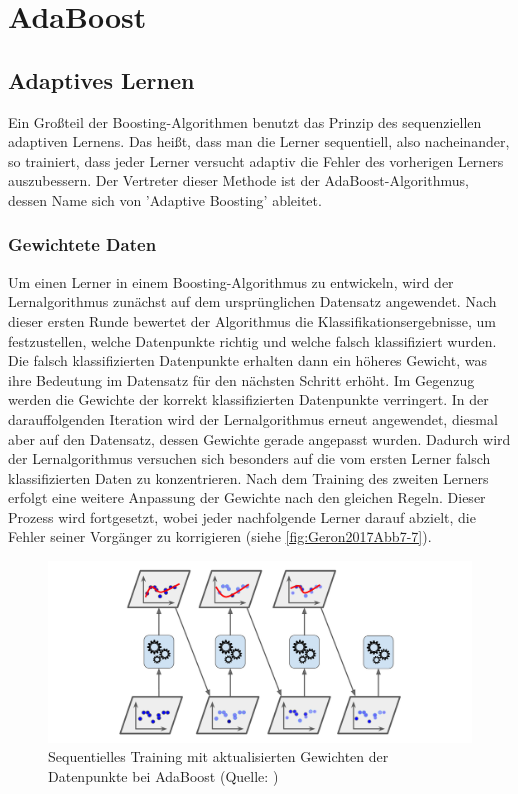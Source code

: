 \section{AdaBoost}
\subsection{Adaptives Lernen}
\label{sec:adaptive_learning}
Ein Großteil der Boosting-Algorithmen benutzt das Prinzip des sequenziellen adaptiven Lernens. Das heißt, dass man die Lerner sequentiell, also nacheinander, so trainiert, dass jeder Lerner versucht adaptiv die Fehler des vorherigen Lerners auszubessern.
\newline
Der Vertreter dieser Methode ist der AdaBoost-Algorithmus, dessen Name sich von 'Adaptive Boosting' ableitet.
\subsubsection{Gewichtete Daten}
Um einen Lerner in einem Boosting-Algorithmus zu entwickeln, wird der Lernalgorithmus zunächst auf dem ursprünglichen Datensatz angewendet. Nach dieser ersten Runde bewertet der Algorithmus die Klassifikationsergebnisse, um festzustellen, welche Datenpunkte richtig und welche falsch klassifiziert wurden. Die falsch klassifizierten Datenpunkte erhalten dann ein höheres Gewicht, was ihre Bedeutung im Datensatz für den nächsten Schritt erhöht. Im Gegenzug werden die Gewichte der korrekt klassifizierten Datenpunkte verringert.
\newline
In der darauffolgenden Iteration wird der Lernalgorithmus erneut angewendet, diesmal aber auf den Datensatz, dessen Gewichte gerade angepasst wurden. Dadurch wird der Lernalgorithmus versuchen sich besonders auf die vom ersten Lerner falsch klassifizierten Daten zu konzentrieren. Nach dem Training des zweiten Lerners erfolgt eine weitere Anpassung der Gewichte nach den gleichen Regeln.
\newline
Dieser Prozess wird fortgesetzt, wobei jeder nachfolgende Lerner darauf abzielt, die Fehler seiner Vorgänger zu korrigieren (siehe \autoref{fig:Geron2017Abb7-7}).

\begin{figure}[h]
    \centering
    \includegraphics[width=\linewidth]{Images/Geron2017Abb7-7.png}
    \caption[Sequentielles Training mit aktualisierten Gewichten der Datenpunkte bei AdaBoost]{Sequentielles Training mit aktualisierten Gewichten der Datenpunkte bei AdaBoost (Quelle: \textcite[Abbildung 7-7][S.~192]{Geron2018})}
    \label{fig:Geron2017Abb7-7}
\end{figure}

